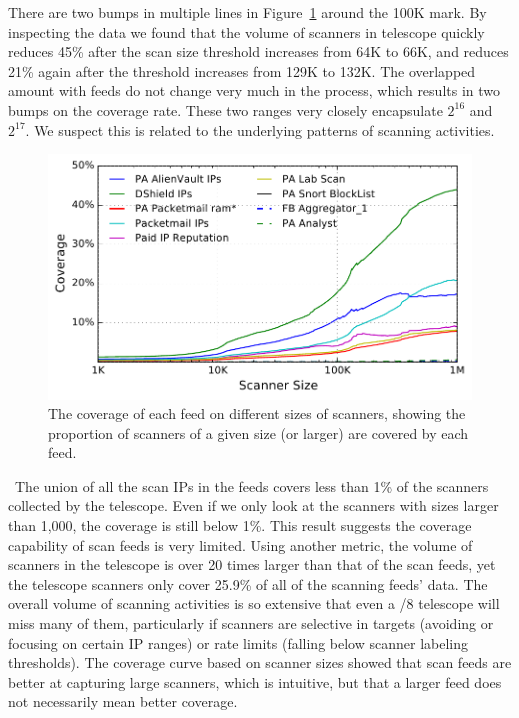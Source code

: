 There are two bumps in multiple lines in
Figure~\ref{fig:caida_coverage_cdf} around the 100K mark. By inspecting
the data we found that the volume of scanners in telescope quickly
reduces 45\% after the scan size threshold increases from 64K to 66K,
and reduces 21\% again after the threshold increases from 129K to 132K.
The overlapped amount with feeds do not change very much in the process,
which results in two bumps on the coverage rate. These two ranges very
closely encapsulate $2^{16}$ and $2^{17}$. We suspect this is related to
the underlying patterns of scanning activities.


\begin{figure}
\centering
\includegraphics[width=\linewidth]{images/caida_coverage_cdf.pdf}
\caption{The coverage of each feed on different sizes of scanners,
showing the proportion of scanners of a given size (or larger) are
covered by each feed.}
\label{fig:caida_coverage_cdf}
\end{figure}

\finding\ The union of all the scan IPs in the feeds covers less than
1\% of the scanners collected by the telescope. Even if we only look
at the scanners with sizes larger than 1,000, the coverage is still
below 1\%. This result suggests the coverage capability of scan feeds
is very limited. Using another metric, the volume of scanners in the
telescope is over 20 times larger than that of the scan feeds, yet the
telescope scanners only cover 25.9\% of all of the scanning feeds'
data. The overall volume of scanning activities is so extensive that
even a /8 telescope will miss many of them, particularly if scanners
are selective in targets (avoiding or focusing on certain IP ranges)
or rate limits (falling below scanner labeling thresholds). The
coverage curve based on scanner sizes showed that scan feeds are
better at capturing large scanners, which is intuitive, but that a
larger feed does not necessarily mean better coverage.



